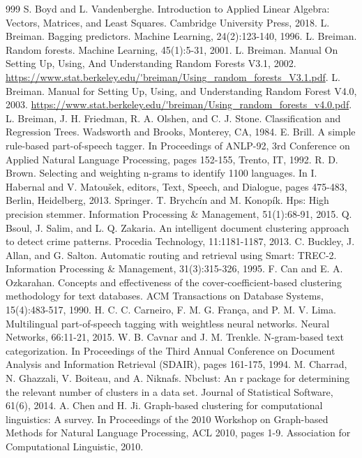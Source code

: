 \documentclass[11pt,openany,executivepaper]{book}
\begin{document}
\begin{thebibliography}{999}
 S. Boyd and L. Vandenberghe. Introduction to Applied Linear Algebra: Vectors, Matrices, and Least Squares. Cambridge University Press, 2018.
 L. Breiman. Bagging predictors. Machine Learning, 24(2):123-140, 1996.
 L. Breiman. Random forests. Machine Learning, 45(1):5-31, 2001.
 L. Breiman. Manual On Setting Up, Using, And Understanding Random Forests V3.1, 2002. \url{https://www.stat.berkeley.edu/'breiman/Using_random_forests_V3.1.pdf}.
 L. Breiman. Manual for Setting Up, Using, and Understanding Random Forest V4.0, 2003. \url{https://www.stat.berkeley.edu/'breiman/Using_random_forests_v4.0.pdf}.
 L. Breiman, J. H. Friedman, R. A. Olshen, and C. J. Stone. Classification and Regression Trees. Wadsworth and Brooks, Monterey, CA, 1984.
 E. Brill. A simple rule-based part-of-speech tagger. In Proceedings of ANLP-92, 3rd Conference on Applied Natural Language Processing, pages 152-155, Trento, IT, 1992.
 R. D. Brown. Selecting and weighting n-grams to identify 1100 languages. In I. Habernal and V. Matoušek, editors, Text, Speech, and Dialogue, pages 475-483, Berlin, Heidelberg, 2013. Springer.
 T. Brychcín and M. Konopík. Hps: High precision stemmer. Information Processing \& Management, 51(1):68-91, 2015.
 Q. Bsoul, J. Salim, and L. Q. Zakaria. An intelligent document clustering approach to detect crime patterns. Procedia Technology, 11:1181-1187, 2013.
 C. Buckley, J. Allan, and G. Salton. Automatic routing and retrieval using Smart: TREC-2. Information Processing \& Management, 31(3):315-326, 1995.
 F. Can and E. A. Ozkarahan. Concepts and effectiveness of the cover-coefficient-based clustering methodology for text databases. ACM Transactions on Database Systems, 15(4):483-517, 1990.
 H. C. C. Carneiro, F. M. G. França, and P. M. V. Lima. Multilingual part-of-speech tagging with weightless neural networks. Neural Networks, 66:11-21, 2015.
 W. B. Cavnar and J. M. Trenkle. N-gram-based text categorization. In Proceedings of the Third Annual Conference on Document Analysis and Information Retrieval (SDAIR), pages 161-175, 1994.
 M. Charrad, N. Ghazzali, V. Boiteau, and A. Niknafs. Nbclust: An r package for determining the relevant number of clusters in a data set. Journal of Statistical Software, 61(6), 2014.
 A. Chen and H. Ji. Graph-based clustering for computational linguistics: A survey. In Proceedings of the 2010 Workshop on Graph-based Methods for Natural Language Processing, ACL 2010, pages 1-9. Association for Computational Linguistic, 2010.

\end{thebibliography}
\end{document}
